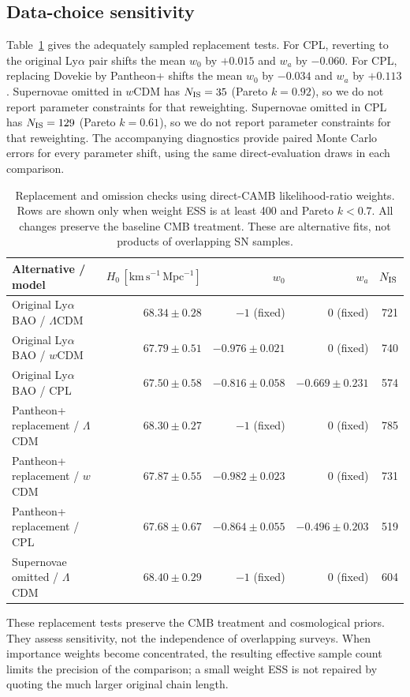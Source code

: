 \documentclass[fleqn,usenatbib]{mnras}
\newcommand{\hunit}{\mathrm{km\,s^{-1}\,Mpc^{-1}}}
\begin{document}
\subsection{Data-choice sensitivity}
Table~\ref{tab:sensitivity} gives the adequately sampled replacement tests. For CPL, reverting to the original Ly$\alpha$ pair shifts the mean $w_0$ by $+0.015$ and $w_a$ by $-0.060$. For CPL, replacing Dovekie by Pantheon+ shifts the mean $w_0$ by $-0.034$ and $w_a$ by $+0.113$. Supernovae omitted in $w$CDM has $N_{\rm IS}=35$ (Pareto $k=0.92$), so we do not report parameter constraints for that reweighting. Supernovae omitted in CPL has $N_{\rm IS}=129$ (Pareto $k=0.61$), so we do not report parameter constraints for that reweighting. The accompanying diagnostics provide paired Monte Carlo errors for every parameter shift, using the same direct-evaluation draws in each comparison.
\begin{table}\centering
\caption{Replacement and omission checks using direct-CAMB likelihood-ratio weights. Rows are shown only when weight ESS is at least 400 and Pareto $k<0.7$. All changes preserve the baseline CMB treatment. These are alternative fits, not products of overlapping SN samples.}\label{tab:sensitivity}
\begin{tabular}{lrrrr}\toprule
Alternative / model & $H_0\,[\hunit]$ & $w_0$ & $w_a$ & $N_{\rm IS}$\\\midrule
Original Ly$\alpha$ BAO / $\Lambda$CDM & $68.34\pm0.28$ & $-1$ (fixed) & $0$ (fixed) & 721\\
Original Ly$\alpha$ BAO / $w$CDM & $67.79\pm0.51$ & $-0.976\pm0.021$ & $0$ (fixed) & 740\\
Original Ly$\alpha$ BAO / CPL & $67.50\pm0.58$ & $-0.816\pm0.058$ & $-0.669\pm0.231$ & 574\\
Pantheon+ replacement / $\Lambda$CDM & $68.30\pm0.27$ & $-1$ (fixed) & $0$ (fixed) & 785\\
Pantheon+ replacement / $w$CDM & $67.87\pm0.55$ & $-0.982\pm0.023$ & $0$ (fixed) & 731\\
Pantheon+ replacement / CPL & $67.68\pm0.67$ & $-0.864\pm0.055$ & $-0.496\pm0.203$ & 519\\
Supernovae omitted / $\Lambda$CDM & $68.40\pm0.29$ & $-1$ (fixed) & $0$ (fixed) & 604\\
\bottomrule\end{tabular}
\end{table}
These replacement tests preserve the CMB treatment and cosmological priors.
They assess sensitivity, not the independence of overlapping surveys. When
importance weights become concentrated, the resulting effective sample count
limits the precision of the comparison; a small weight ESS is not repaired by
quoting the much larger original chain length.
\end{document}

